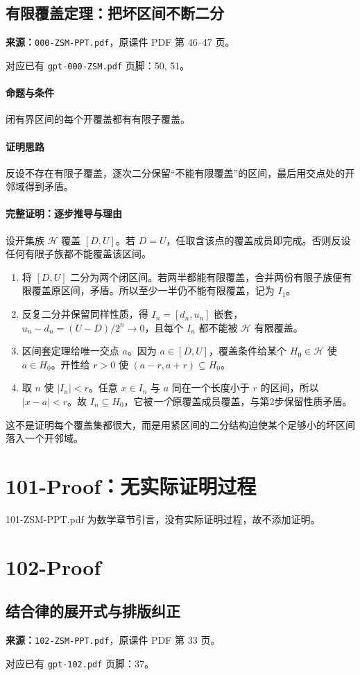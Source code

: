 \clearpage\subsection{有限覆盖定理：把坏区间不断二分}
\textbf{来源：}\texttt{000-ZSM-PPT.pdf}，原课件 PDF 第 46--47 页。\par
对应已有 \texttt{gpt-000-ZSM.pdf} 页脚：50, 51。\par
\paragraph{命题与条件}闭有界区间的每个开覆盖都有有限子覆盖。
\paragraph{证明思路}反设不存在有限子覆盖，逐次二分保留“不能有限覆盖”的区间，最后用交点处的开邻域得到矛盾。
\paragraph{完整证明：逐步推导与理由}

设开集族 $\mathcal H$ 覆盖 $[D,U]$。若 $D=U$，任取含该点的覆盖成员即完成。否则反设任何有限子族都不能覆盖该区间。
\begin{enumerate}
\item 将 $[D,U]$ 二分为两个闭区间。若两半都能有限覆盖，合并两份有限子族便有限覆盖原区间，矛盾。所以至少一半仍不能有限覆盖，记为 $I_1$。
\item 反复二分并保留同样性质，得 $I_n=[d_n,u_n]$ 嵌套，$u_n-d_n=(U-D)/2^n\to0$，且每个 $I_n$ 都不能被 $\mathcal H$ 有限覆盖。
\item 区间套定理给唯一交点 $a$。因为 $a\in[D,U]$，覆盖条件给某个 $H_0\in\mathcal H$ 使 $a\in H_0$。开性给 $r>0$ 使 $(a-r,a+r)\subseteq H_0$。
\item 取 $n$ 使 $|I_n|<r$。任意 $x\in I_n$ 与 $a$ 同在一个长度小于 $r$ 的区间，所以 $|x-a|<r$。故 $I_n\subseteq H_0$，它被\emph{一个}原覆盖成员覆盖，与第2步保留性质矛盾。
\end{enumerate}
这不是证明每个覆盖集都很大，而是用紧区间的二分结构迫使某个足够小的坏区间落入一个开邻域。

\clearpage\section{101-Proof：无实际证明过程}101-ZSM-PPT.pdf 为数学章节引言，没有实际证明过程，故不添加证明。
\clearpage\section{102-Proof}
\clearpage\subsection{结合律的展开式与排版纠正}
\textbf{来源：}\texttt{102-ZSM-PPT.pdf}，原课件 PDF 第 33 页。\par
对应已有 \texttt{gpt-102.pdf} 页脚：37。\par
